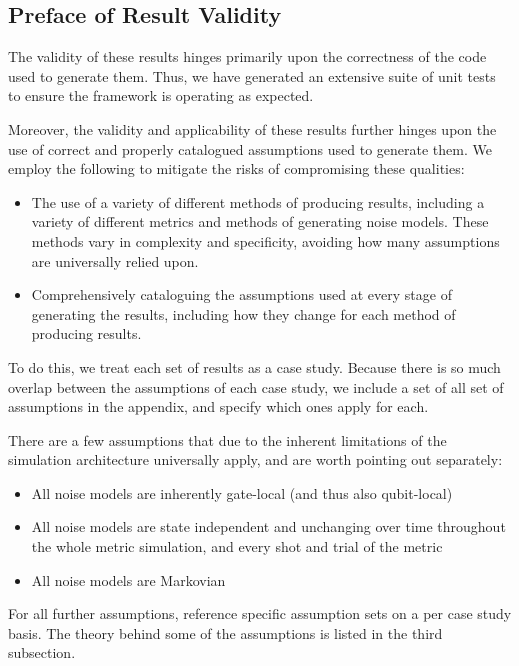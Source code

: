 \documentclass[showpacs,amsmath,amssymb,twocolumn,superscriptaddress,notitlepage,preprintnumbers,pra]{revtex4-1}
\begin{document}
\subsection{Preface of Result Validity}

The validity of these results hinges primarily upon the correctness of the code used to generate them. Thus, we have generated an extensive suite of unit tests to ensure the framework is operating as expected.

Moreover, the validity and applicability of these results further hinges upon the use of correct and properly catalogued assumptions used to generate them. We employ the following to mitigate the risks of compromising these qualities:
\begin{itemize}[itemsep=1pt]
	\item The use of a variety of different methods of producing results, including a variety of different metrics and methods of generating noise models. These methods vary in complexity and specificity, avoiding how many assumptions are universally relied upon.
	\item Comprehensively cataloguing the assumptions used at every stage of generating the results, including how they change for each method of producing results.
\end{itemize}

To do this, we treat each set of results as a case study. Because there is so much overlap between the assumptions of each case study, we include a set of all set of assumptions in the appendix, and specify which ones apply for each.

There are a few assumptions that due to the inherent limitations of the simulation architecture universally apply, and are worth pointing out separately:

\begin{itemize}
	\item All noise models are inherently gate-local (and thus also qubit-local)
	\item All noise models are state independent and unchanging over time throughout the whole metric simulation, and every shot and trial of the metric
	\item All noise models are Markovian
\end{itemize}

For all further assumptions, reference specific assumption sets on a per case study basis. The theory behind some of the assumptions is listed in the third subsection.
\end{document}
